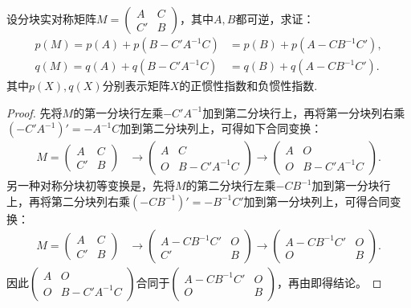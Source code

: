\documentclass[../../main.tex]{subfiles}%
\begin{document}
\begin{proposition}[正负惯性指数的降阶公式]\label{proposition:正负惯性指数的降阶公式}
设分块实对称矩阵\(M = \begin{pmatrix}
A & C \\
C' & B
\end{pmatrix}\)，其中\(A,B\)都可逆，求证：
\begin{align*}
p(M)=p(A)+p(B - C'A^{-1}C)&=p(B)+p(A - CB^{-1}C'),\\
q(M)=q(A)+q(B - C'A^{-1}C)&=q(B)+q(A - CB^{-1}C').
\end{align*}
其中$p(X),q(X)$分别表示矩阵$X$的正惯性指数和负惯性指数.
\end{proposition}
\begin{proof}
先将\(M\)的第一分块行左乘\(-C'A^{-1}\)加到第二分块行上，再将第一分块列右乘\((-C'A^{-1})'=-A^{-1}C\)加到第二分块列上，可得如下合同变换：
\begin{align*}
M = \begin{pmatrix}
A & C \\
C' & B
\end{pmatrix}
&\rightarrow\begin{pmatrix}
A & C \\
O & B - C'A^{-1}C
\end{pmatrix}
\rightarrow\begin{pmatrix}
A & O \\
O & B - C'A^{-1}C
\end{pmatrix}.
\end{align*}
另一种对称分块初等变换是，先将\(M\)的第二分块行左乘\(-CB^{-1}\)加到第一分块行上，再将第二分块列右乘\((-CB^{-1})'=-B^{-1}C'\)加到第一分块列上，可得合同变换：
\begin{align*}
M = \begin{pmatrix}
A & C \\
C' & B
\end{pmatrix}
&\rightarrow\begin{pmatrix}
A - CB^{-1}C' & O \\
C' & B
\end{pmatrix}
\rightarrow\begin{pmatrix}
A - CB^{-1}C' & O \\
O & B
\end{pmatrix}.
\end{align*}
因此\(\begin{pmatrix}
A & O \\
O & B - C'A^{-1}C
\end{pmatrix}\)合同于\(\begin{pmatrix}
A - CB^{-1}C' & O \\
O & B
\end{pmatrix}\)，再由即得结论。
\end{proof} 
\end{document}
